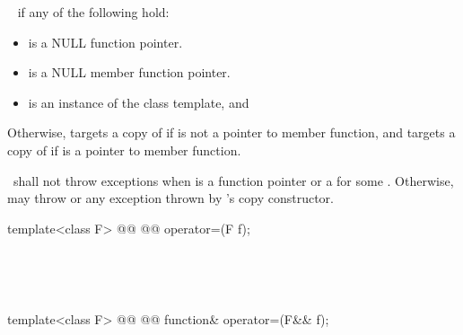 \documentclass[american,twoside]{book}
\begin{document}
\begin{itemdescr}
\pnum{}

\pnum\postconditions\  if any of the following hold:
\begin{itemize}
\item{ is a NULL function pointer.}
\item{ is a NULL member function pointer.}
\item{ is an instance of the  class template, and
  }
\end{itemize}

\pnum
Otherwise,  targets a copy of 
 if  is
not a pointer to member function, and targets a copy
of  if  is a pointer to member function.

\pnum\throws\ shall not throw exceptions when  is a function pointer 
or a  for some . Otherwise,
may throw  or any exception thrown by 's copy
 constructor.
\end{itemdescr}

\setcounter{Paras}{18}
%
%
\begin{itemdecl}
template<class F> 
  @@ 
           @@
  operator=(F f);
\end{itemdecl}

\begin{itemdescr}
\pnum\effects\ 

\pnum\returns\ 
\end{itemdescr}

%
%
\begin{itemdecl}
template<class F> 
  @@ 
           @@
  function& operator=(F&& f);
\end{itemdecl}
\end{document}
